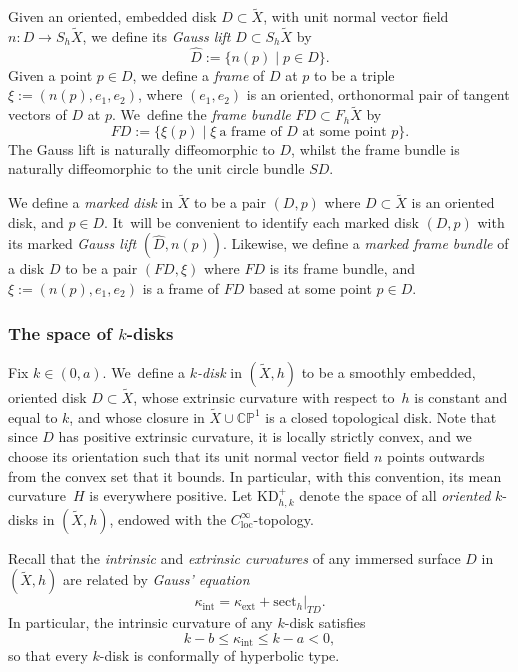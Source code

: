 \documentclass[11pt]{article}
\newcommand{\kdisk}{$k$\nobreakdash-disk\xspace}
\newcommand{\kdisks}{$k$\nobreakdash-disks\xspace}
\newcommand{\intt}{\mathrm{int}}
\newcommand{\ext}{\mathrm{ext}}
\theoremstyle{plain}
\theoremstyle{definition}
\newcommand\CP{\C\PP^1}
\newcommand{\C}{{\mathbb C}}
\newcommand{\PP}{{\mathbb P}}
\let\dans\subset
\newcommand{\loc}{\mathrm{loc}}
\newcommand{\sect}{\mathrm{sect}}
\newcommand{\KD}{\mathrm{KD}}
\begin{document}
Given an oriented, embedded disk $D\dans\tilde{X}$, with unit normal vector field $n:D\to S_h\tilde{X}$, we define its \emph{Gauss lift} $\hat{D}\dans S_h\tilde{X}$ by
\begin{equation*}
\hat{D} := \{n(p)\mid p\in D\}.
\end{equation*}
Given a point $p\in D$, we define a \emph{frame} of $D$ at $p$ to be a triple $\xi:=(n(p),e_1,e_2)$, where $(e_1,e_2)$ is an oriented, orthonormal pair of tangent vectors of $D$ at $p$. We~define the \emph{frame bundle} $FD\dans F_h\tilde{X}$ by
\begin{equation*}
FD := \{\xi(p)\mid \xi\ \text{a frame of $D$ at some point $p$}\}.
\end{equation*}
The Gauss lift is naturally diffeomorphic to $D$, whilst the frame bundle is naturally diffeomorphic to the unit circle bundle $SD$.

We define a \emph{marked disk} in $\tilde{X}$ to be a pair $(D,p)$ where $D\dans\tilde{X}$ is an oriented disk, and $p\in D$. It~will be convenient to identify each marked disk $(D,p)$ with its marked \emph{Gauss lift} $(\hat{D},n(p))$. Likewise, we define a \emph{marked frame bundle} of a disk $D$ to be a pair $(FD,\xi)$ where $FD$ is its frame bundle, and $\xi:=(n(p),e_1,e_2)$ is a frame of $FD$ based at some point $p\in D$.

\subsubsection{The space of $k$-disks}\label{sss.space_k_discs}
Fix $k\in(0,a)$. We~define a \emph{\kdisk} in $(\tilde{X},h)$ to be a smoothly embedded, oriented disk $D\dans \tilde{X}$, whose extrinsic curvature with respect to~$h$ is constant and equal to $k$, and whose closure in $\tilde{X}\cup\CP$ is a closed topological disk. Note that since $D$ has positive extrinsic curvature, it is locally strictly convex, and we choose its orientation such that its unit normal vector field $n$ points outwards from the convex set that it bounds. In particular, with this convention, its mean curvature~$H$ is everywhere positive. Let $\KD^+_{h,k}$ denote the space of all \emph{oriented} \kdisks in $(\tilde{X},h)$, endowed with the $C^\infty_{\loc}$-topology.

Recall that the \emph{intrinsic} and \emph{extrinsic curvatures} of any immersed surface $D$ in $(\tilde{X},h)$ are related by \emph{Gauss' equation}
\begin{equation}
\kappa_{\intt}=\kappa_{\ext}+\sect_h|_{TD}.
\end{equation}
In particular, the intrinsic curvature of any \kdisk satisfies
\begin{equation}\label{eq_intr_curv}
k-b\leq\kappa_{\intt}\leq k-a<0,
\end{equation}
so that every \kdisk is conformally of hyperbolic type.
\end{document}
